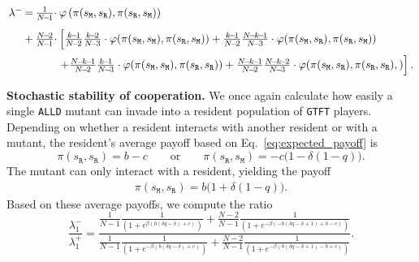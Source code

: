 \documentclass[11pt]{article}
\def\alld{\texttt{ALLD}}
\def\gtft{\texttt{GTFT}}
\def\resident{\texttt{R}}
\def\mutant{\texttt{M}}
\def\strategy{s}
\theoremstyle{plainCl1}
\theoremstyle{plainCl2}
\begin{document}
\begin{equation*}
  \setlength{\arraycolsep}{1pt} 
  \begin{array}{llll}
    \lambda^-	 &=
  &\frac{1}{N\!-\!1}\cdot  & \varphi\left(\pi (\strategy_\mutant, \strategy_\resident), \pi(\strategy_\resident, \strategy_\mutant)\right)\\[0.3cm]
  &+
  &\frac{N\!-\!2}{N\!-\!1} \cdot 
  &\left[ \frac{k\!-\!1}{N\!-\!2}\frac{k\!-\!2}{N\!-\!3}\cdot \varphi(\pi(\strategy_\mutant, \strategy_\mutant), \pi(\strategy_\resident, \strategy_\mutant)) + 
   \frac{k\!-\!1}{N\!-\!2}\frac{N\!-\!k\!-\!1}{N\!-\!3}\cdot \varphi(\pi(\strategy_\mutant, \strategy_\resident), \pi(\strategy_\resident, \strategy_\mutant)) \right.\\[0.3cm]
  &&&\left. +\frac{N\!-\!k\!-\!1}{N\!-\!2}\frac{k\!-\!1}{N\!-\!3} \cdot \varphi(\pi(\strategy_\mutant, \strategy_\mutant), \pi(\strategy_\resident, \strategy_\resident)) + 
   \frac{N\!-\!k\!-\!1}{N\!-\!2}\frac{N\!-\!k\!-\!2}{N\!-\!3} \cdot \varphi(\pi(\strategy_\mutant, \strategy_\resident), \pi(\strategy_\resident, \strategy_\resident),)\right].
  \end{array}
\end{equation*}


\noindent
{\bf Stochastic stability of cooperation.}
We once again calculate how easily a single \alld{} mutant can invade into a
resident population of \gtft{} players. 
Depending on whether a resident interacts with another resident or with a mutant,
the resident's average payoff based on Eq.~\eqref{eq:expected_payoff} is
\begin{equation*}
  \pi (\strategy_\resident, \strategy_\resident) =  b - c \quad \quad \text{or} \quad \quad \pi (\strategy_\resident, \strategy_\mutant) =  - c \big(1-\delta(1 \!-\! q)\big).
\end{equation*}
The mutant can only interact with a resident, yielding the payoff
\begin{align*}
  \pi (\strategy_\mutant, \strategy_\resident) =  b \big(1+\delta \left(1\!-\!q\right) \big).
\end{align*}
Based on these average payoffs, we compute the ratio
\begin{equation}
  \frac{\lambda^{-}_1}{\lambda^{+}_1} =
  \frac{\frac{1}{N-1}\frac{1}{\left(1 + e^{\beta \left(b \left(\delta q - \delta\right) + c\right)}\right)}
  + \frac{N - 2}{N-1}\frac{1}{\left(1 + e^{- \beta \left(- b \left(\delta q - \delta + 1\right) + b - c\right)}\right)}}
  {\frac{1}{N-1}\frac{1}{\left(1 + e^{- \beta \left(b \left(\delta q - \delta\right) + c\right)}\right)}
  + \frac{N - 2}{N-1}\frac{1}{\left(1 + e^{- \beta \left(b \left(\delta q - \delta + 1\right) - b + c\right)}\right)}}.
\end{equation}
\end{document}
